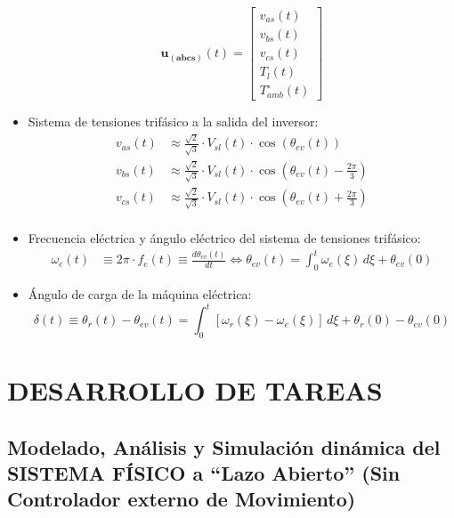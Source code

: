 \documentclass[a4paper, 10pt, onecolumn,journal]{ieeeconf}
\begin{document}
\begin{itemize}
\begin{equation}
        \mathbf{u_{(abcs)}}(t) = \begin{bmatrix} v_{as}(t) \\ v_{bs}(t) \\ v_{cs}(t)\\ T_l(t) \\ T_{amb}^{\circ}(t) \end{bmatrix}
        \label{vector de entradas}
    \end{equation}
    \item Sistema de tensiones trifásico a la salida del inversor:
    \begin{align}
        v_{as}(t) &\approx \frac{\sqrt{2}}{\sqrt{3}} \cdot V_{sl}(t) \cdot \cos(\theta_{ev}(t)) \\
        v_{bs}(t) &\approx \frac{\sqrt{2}}{\sqrt{3}} \cdot V_{sl}(t) \cdot \cos\left(\theta_{ev}(t) - \frac{2\pi}{3}\right) \\
        v_{cs}(t) &\approx \frac{\sqrt{2}}{\sqrt{3}} \cdot V_{sl}(t)\cdot \cos\left(\theta_{ev}(t) + \frac{2\pi}{3}\right)\\
        \label{sistema de tensiones trifásico real}
    \end{align}
    \item Frecuencia eléctrica y ángulo eléctrico del sistema de tensiones trifásico:
    \begin{align}
        \omega_e(t) &\equiv 2\pi \cdot f_e(t) \equiv \frac{d\theta_{ev}(t)}{dt} \iff \theta_{ev}(t) = \int_{0}^{t} \omega_e(\xi) \, d\xi + \theta_{ev}(0)
        \label{frecuencia eléctrica y ángulo eléctrico}
    \end{align}
    \item Ángulo de carga de la máquina eléctrica:
    \begin{equation}
        \delta(t) \equiv \theta_r(t) - \theta_{ev}(t) = \int_{0}^{t} [\omega_r(\xi) - \omega_e(\xi)] \, d\xi + \theta_r(0) - \theta_{ev}(0)
        \label{ángulo de carga}
    \end{equation}
\end{itemize}

\section{DESARROLLO DE TAREAS}

\subsection{\textbf{Modelado, Análisis y Simulación dinámica del SISTEMA FÍSICO a “Lazo Abierto” (Sin Controlador externo de Movimiento)}}
\label{subsec: modelado, simulación y análisis del sistema físico}
\end{document}
